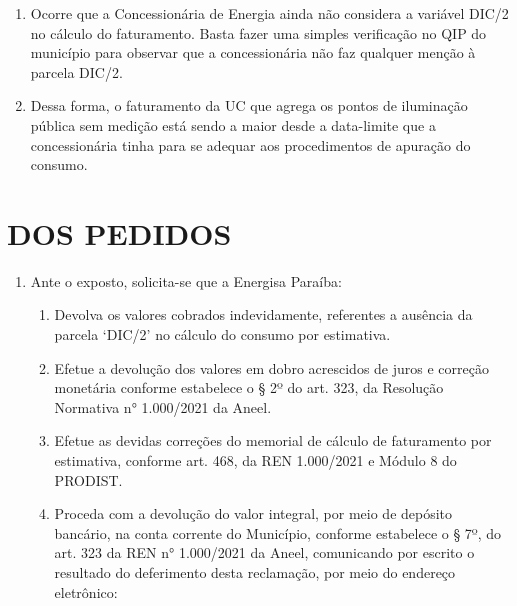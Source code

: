 \begin{enumerate}[resume]
{    [...]

    II - 7 de julho de 2021 para adequação ao §4º do art. 21-A, §4º do art. 21-E, §1º do art. 22, inciso IV do art. 24 e §7º do art. 24-A; (grifou-se)
}

\item Ocorre que a Concessionária de Energia ainda não considera a variável DIC/2 no cálculo do faturamento. Basta fazer uma simples verificação no QIP do município para observar que a concessionária não faz qualquer menção à parcela DIC/2.

\item Dessa forma, o faturamento da UC que agrega os pontos de iluminação pública sem medição está sendo a maior desde a data-limite que a concessionária tinha para se adequar aos procedimentos de apuração do consumo.

\end{enumerate}

\section{DOS PEDIDOS}

\begin{enumerate}[resume]
\item Ante o exposto, solicita-se que a Energisa Paraíba: 
    \begin{enumerate}
        \item Devolva os valores cobrados indevidamente, referentes a ausência da parcela ‘DIC/2’ no cálculo do consumo por estimativa.
        \item Efetue a devolução dos valores em dobro acrescidos de juros e correção monetária conforme estabelece o § 2º do art. 323, da Resolução Normativa n° 1.000/2021 da Aneel.
        \item Efetue as devidas correções do memorial de cálculo de faturamento por estimativa, conforme art. 468, da REN 1.000/2021 e Módulo 8 do PRODIST.
        \item Proceda com a devolução do valor integral, por meio de depósito bancário, na conta corrente do Município, conforme estabelece o § 7º, do art. 323 da REN n° 1.000/2021 da Aneel, comunicando por escrito o resultado do deferimento desta reclamação, por meio do endereço eletrônico: \emailEmpresa{}
    \end{enumerate}
\end{enumerate}